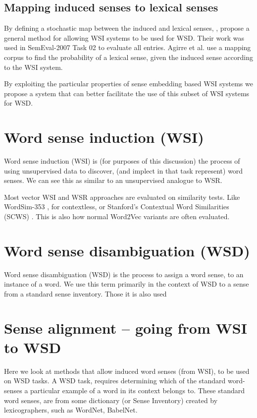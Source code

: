 \documentclass[12pt,parskip]{komatufte}
\begin{document}
\subsection{Mapping induced senses to lexical senses}\label{mapping}
By defining a stochastic map between the induced and lexical senses, , propose a general method for allowing WSI systems to be used for WSD.
Their work was used in SemEval-2007 Task 02 \parencite{SemEval2007WSIandWSD} to evaluate all entries. 
Agirre et al. use a mapping corpus to find the probability of a lexical sense, given the induced sense according to the WSI system.

By exploiting the particular properties of sense embedding based WSI systems we propose a system that can better facilitate the use of this subset of WSI systems for WSD.


\section{Word sense induction (WSI)}
Word sense induction (WSI) is (for purposes of this discussion) the process of using unsupervised data to discover, (and implect in that task represent) word senses.
We can see this as similar to an unsupervised analogue to WSR.

Most vector WSI and WSR approaches are evaluated on similarity tests.
Like WordSim-353 \cite{WordSim353}, for contextless, or Stanford's Contextual Word Similarities (SCWS) \cite{Huang2012}. This is also how normal Word2Vec variants are often evaluated.









\section{Word sense disambiguation (WSD)}
Word sense disambiguation (WSD) is the process to assign a word sense, to an instance of a word. We use this term primarily in the context of WSD to a sense from a standard sense inventory. Those it is also used 



\section{Sense alignment -- going from WSI to WSD}
Here we look at methods that allow induced word senses (from WSI), to be used on WSD tasks.
A WSD task, requires determining which of the standard word-senses a particular example of a word in its context belongs to.
These standard word senses, are from some dictionary (or Sense Inventory) created by 
lexicographers, such as WordNet, BabelNet.
\end{document}
